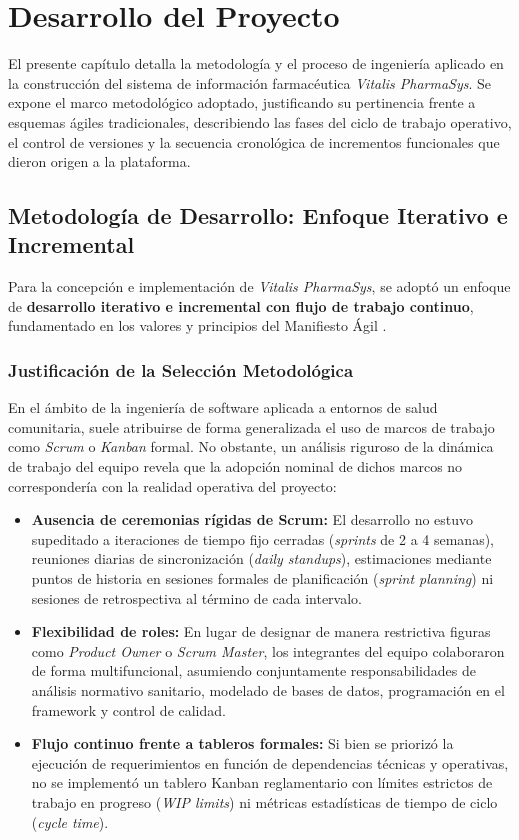 \chapter{Desarrollo del Proyecto}

El presente capítulo detalla la metodología y el proceso de ingeniería aplicado en la construcción del sistema de información farmacéutica \textit{Vitalis PharmaSys}. Se expone el marco metodológico adoptado, justificando su pertinencia frente a esquemas ágiles tradicionales, describiendo las fases del ciclo de trabajo operativo, el control de versiones y la secuencia cronológica de incrementos funcionales que dieron origen a la plataforma.

\section{Metodología de Desarrollo: Enfoque Iterativo e Incremental}

Para la concepción e implementación de \textit{Vitalis PharmaSys}, se adoptó un enfoque de \textbf{desarrollo iterativo e incremental con flujo de trabajo continuo}, fundamentado en los valores y principios del Manifiesto Ágil \cite{pressman2014, sommerville2011}.

\subsection{Justificación de la Selección Metodológica}

En el ámbito de la ingeniería de software aplicada a entornos de salud comunitaria, suele atribuirse de forma generalizada el uso de marcos de trabajo como \textit{Scrum} o \textit{Kanban} formal. No obstante, un análisis riguroso de la dinámica de trabajo del equipo revela que la adopción nominal de dichos marcos no correspondería con la realidad operativa del proyecto:

\begin{itemize}
    \item \textbf{Ausencia de ceremonias rígidas de Scrum:} El desarrollo no estuvo supeditado a iteraciones de tiempo fijo cerradas (\textit{sprints} de 2 a 4 semanas), reuniones diarias de sincronización (\textit{daily standups}), estimaciones mediante puntos de historia en sesiones formales de planificación (\textit{sprint planning}) ni sesiones de retrospectiva al término de cada intervalo.
    \item \textbf{Flexibilidad de roles:} En lugar de designar de manera restrictiva figuras como \textit{Product Owner} o \textit{Scrum Master}, los integrantes del equipo colaboraron de forma multifuncional, asumiendo conjuntamente responsabilidades de análisis normativo sanitario, modelado de bases de datos, programación en el framework y control de calidad.
    \item \textbf{Flujo continuo frente a tableros formales:} Si bien se priorizó la ejecución de requerimientos en función de dependencias técnicas y operativas, no se implementó un tablero Kanban reglamentario con límites estrictos de trabajo en progreso (\textit{WIP limits}) ni métricas estadísticas de tiempo de ciclo (\textit{cycle time}).
\end{itemize}

